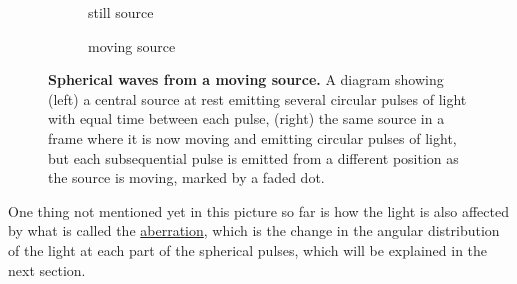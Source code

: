 \begin{figure}[H]
	\centering
	\begin{subfigure}{0.45\textwidth}
		\centering
		\caption{still source}
		\label{subfig_1: doppler effect intro}
	\end{subfigure}
	\begin{subfigure}{0.45\textwidth}
		\centering
		\caption{moving source}
		\label{subfig_2: doppler effect intro}
	\end{subfigure}
	\caption{\textbf{Spherical waves from a moving source.} A diagram showing (left) a central source at rest emitting several circular pulses of light with equal time between each pulse, (right) the same source in a frame where it is now moving and emitting circular pulses of light, but each subsequential pulse is emitted from a different position as the source is moving, marked by a faded dot.}
	\label{fig: doppler effect intro}
\end{figure}

One thing not mentioned yet in this picture so far is how the light is also affected by what is called the \hyperlink{def-aberration}{aberration}, which is the change in the angular distribution of the light at each part of the spherical pulses, which will be explained in the next section.

